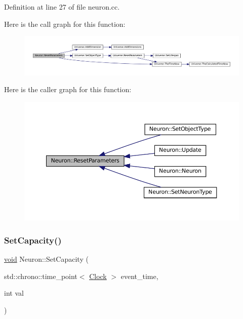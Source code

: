 Definition at line 27 of file neuron.\+cc.

Here is the call graph for this function\+:\nopagebreak
\begin{figure}[H]
\begin{center}
\leavevmode
\includegraphics[width=350pt]{class_neuron_a4c154fecb0b689d7da9d8d274f067ccf_cgraph}
\end{center}
\end{figure}
Here is the caller graph for this function\+:\nopagebreak
\begin{figure}[H]
\begin{center}
\leavevmode
\includegraphics[width=350pt]{class_neuron_a4c154fecb0b689d7da9d8d274f067ccf_icgraph}
\end{center}
\end{figure}
\mbox{\label{class_neuron_a8f5766ea61dc46b7a25361df540755ec}} 
\subsubsection{\texorpdfstring{Set\+Capacity()}{SetCapacity()}}
{\footnotesize\ttfamily \mbox{\hyperlink{glad_8h_a950fc91edb4504f62f1c577bf4727c29}{void}} Neuron\+::\+Set\+Capacity (\begin{DoxyParamCaption}\item[{std\+::chrono\+::time\+\_\+point$<$ \mbox{\hyperlink{universe_8h_a0ef8d951d1ca5ab3cfaf7ab4c7a6fd80}{Clock}} $>$}]{event\+\_\+time,  }\item[{int}]{val }\end{DoxyParamCaption})\hspace{0.3cm}{\ttfamily [inline]}}



